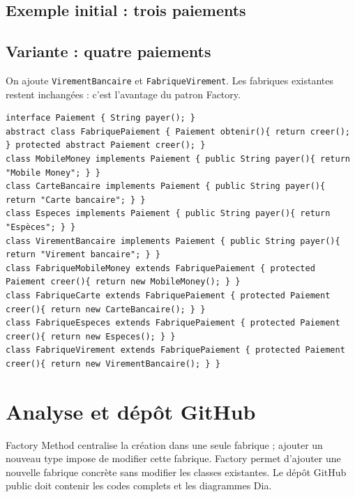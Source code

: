 \documentclass[11pt,a4paper]{article}
\begin{document}
\subsection{Exemple initial : trois paiements}
\begin{center}\end{center}
\subsection{Variante : quatre paiements}
On ajoute \texttt{VirementBancaire} et \texttt{FabriqueVirement}. Les fabriques existantes restent inchangées : c'est l'avantage du patron Factory.
\begin{lstlisting}
interface Paiement { String payer(); }
abstract class FabriquePaiement { Paiement obtenir(){ return creer(); } protected abstract Paiement creer(); }
class MobileMoney implements Paiement { public String payer(){ return "Mobile Money"; } }
class CarteBancaire implements Paiement { public String payer(){ return "Carte bancaire"; } }
class Especes implements Paiement { public String payer(){ return "Espèces"; } }
class VirementBancaire implements Paiement { public String payer(){ return "Virement bancaire"; } }
class FabriqueMobileMoney extends FabriquePaiement { protected Paiement creer(){ return new MobileMoney(); } }
class FabriqueCarte extends FabriquePaiement { protected Paiement creer(){ return new CarteBancaire(); } }
class FabriqueEspeces extends FabriquePaiement { protected Paiement creer(){ return new Especes(); } }
class FabriqueVirement extends FabriquePaiement { protected Paiement creer(){ return new VirementBancaire(); } }
\end{lstlisting}
\section{Analyse et dépôt GitHub}
Factory Method centralise la création dans une seule fabrique ; ajouter un nouveau type impose de modifier cette fabrique. Factory permet d'ajouter une nouvelle fabrique concrète sans modifier les classes existantes. Le dépôt GitHub public doit contenir les codes complets et les diagrammes Dia.
\end{document}
